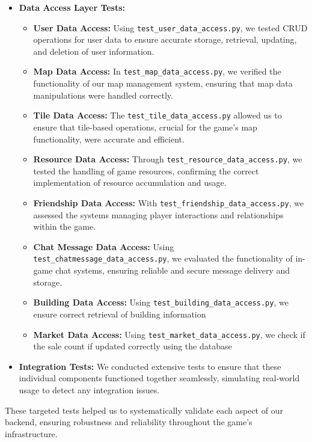 \documentclass[12pt]{article}
\begin{document}
\begin{itemize}
    \item \textbf{Data Access Layer Tests:}
    \begin{itemize}
        \item \textbf{User Data Access:} Using \texttt{test\_user\_data\_access.py}, we tested CRUD operations for user data to ensure accurate storage, retrieval, updating, and deletion of user information.
        \item \textbf{Map Data Access:} In \texttt{test\_map\_data\_access.py}, we verified the functionality of our map management system, ensuring that map data manipulations were handled correctly.
        \item \textbf{Tile Data Access:} The \texttt{test\_tile\_data\_access.py} allowed us to ensure that tile-based operations, crucial for the game's map functionality, were accurate and efficient.
        \item \textbf{Resource Data Access:} Through \texttt{test\_resource\_data\_access.py}, we tested the handling of game resources, confirming the correct implementation of resource accumulation and usage.
        \item \textbf{Friendship Data Access:} With \texttt{test\_friendship\_data\_access.py}, we assessed the systems managing player interactions and relationships within the game.
        \item \textbf{Chat Message Data Access:} Using \texttt{test\_chatmessage\_data\_access.py}, we evaluated the functionality of in-game chat systems, ensuring reliable and secure message delivery and storage.
        \item \textbf{Building Data Access:} Using \texttt{test\_building\_data\_access.py}, we ensure correct retrieval of building information
        \item \textbf{Market Data Access:} Using \texttt{test\_market\_data\_access.py}, we check if the sale count if updated correctly using the database
    \end{itemize}
    \item \textbf{Integration Tests:} We conducted extensive tests to ensure that these individual components functioned together seamlessly, simulating real-world usage to detect any integration issues.
\end{itemize}
These targeted tests helped us to systematically validate each aspect of our backend, ensuring robustness and reliability throughout the game's infrastructure.
\end{document}
